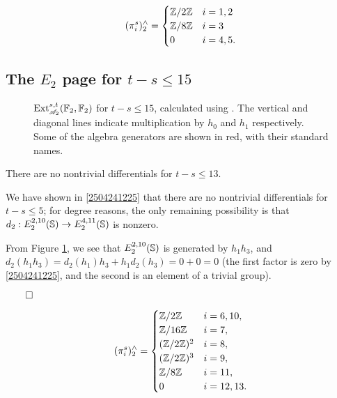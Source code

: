 \documentclass{MetricNotes2023}
\def\bb{\ensuremath\mathbb}
\def\inte{\ensuremath\mathbb{Z}}
\def\A{\ensuremath{\mathscr{A}_2}}
\DeclareMathOperator{\Ext}{Ext}
\def\done{\begin{flushright}\vspace{-4.35ex}\(\qed\)\end{flushright}}
\begin{document}
\begin{theorem}
\begin{align*}
(\pi_i^s)^\wedge_2 = \begin{cases}
\inte/2\inte & i = 1, 2\\
\inte/8\inte & i = 3\\
0 & i = 4, 5.
\end{cases}
\end{align*}
\end{theorem}

\subsection{The \(E_2\) page for \(t-s\leq 15\)}\label{2504291252}

\begin{figure}
\centering

\caption[\(\Ext_{\A}^{s,t}(\bb{F}_2, \bb{F}_2)\) for \(t-s\leq 18\).]{\(\Ext_{\A}^{s,t}(\bb{F}_2, \bb{F}_2)\) for \(t-s\leq 15\), calculated using \autocite{sseq}. The vertical and diagonal lines indicate multiplication by \(h_0\) and \(h_1\) respectively. Some of the algebra generators are shown in red, with their standard names.}
\label{1304251243}
\end{figure}

\begin{lemma}
There are no nontrivial differentials for \(t-s\leq 13\). 
\end{lemma}

\begin{ourproof}
We have shown in \ref{2504241225} that there are no nontrivial differentials for \(t-s\leq 5\); for degree reasons, the only remaining possibility is that \(d_2 : E_2^{2, 10}(\bb{S}) \to E_2^{4, 11}(\bb{S})\) is nonzero.

From Figure \ref{1304251243}, we see that \(E^{2, 10}_2(\bb{S})\) is generated by \(h_1h_3\), and \(d_2(h_1h_3)=d_2(h_1)h_3+h_1d_2(h_3)=0+0=0\) (the first factor is zero by \ref{2504241225}, and the second is an element of a trivial group). \done
\end{ourproof}

\begin{theorem}
\[(\pi_i^s)^\wedge_2=\begin{cases}
\inte/2\inte & i = 6, 10,\\
\inte/16\inte & i = 7,\\
(\inte/2\inte)^2 & i = 8,\\
(\inte/2\inte)^3 & i = 9,\\
\inte/8\inte & i = 11,\\
0 & i = 12, 13.
\end{cases}\]
\end{theorem}
\end{document}
